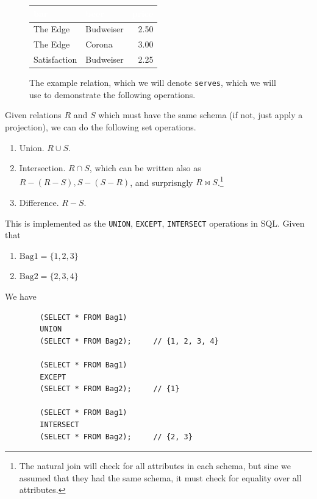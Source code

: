 \documentclass{article}
\begin{document}
    \begin{figure}[H]
      \centering
      \begin{tabular}{|l|l|r|}
      \hline
      \rowcolor[HTML]{E26B0A} 
      \textcolor{white}{\textbf{bar}} & \textcolor{white}{\textbf{beer}} & \textcolor{white}{\textbf{price}} \\ \hline
      \rowcolor[HTML]{FBCEB1}
      The Edge & Budweiser & 2.50 \\ \hline
      \rowcolor[HTML]{FBCEB1}
      The Edge & Corona & 3.00 \\ \hline
      \rowcolor[HTML]{FBCEB1}
      Satisfaction & Budweiser & 2.25 \\ \hline
      \end{tabular}
      \caption{The example relation, which we will denote \texttt{serves}, which we will use to demonstrate the following operations.} 
      \label{fig:serves}
    \end{figure}
    
    \begin{definition}
      Given relations $R$ and $S$ which must have the same schema (if not, just apply a projection), we can do the following set operations. 
      \begin{enumerate}
        \item Union. $R \cup S$. 
        \item Intersection. $R \cap S$, which can be written also as $R - (R - S), S - (S - R)$, and surprisngly $R \bowtie S$.\footnote{The natural join will check for all attributes in each schema, but sine we assumed that they had the same schema, it must check for equality over all attributes.}
        \item Difference. $R - S$. 
      \end{enumerate}
      This is implemented as the \texttt{UNION}, \texttt{EXCEPT}, \texttt{INTERSECT} operations in SQL. Given that 
      \begin{enumerate}
        \item $\mathrm{Bag1} = \{1, 2, 3\}$
        \item $\mathrm{Bag2} = \{2, 3, 4\}$
      \end{enumerate}
      We have 
      \begin{lstlisting}
        (SELECT * FROM Bag1) 
        UNION 
        (SELECT * FROM Bag2);     // {1, 2, 3, 4}

        (SELECT * FROM Bag1) 
        EXCEPT 
        (SELECT * FROM Bag2);     // {1} 

        (SELECT * FROM Bag1) 
        INTERSECT 
        (SELECT * FROM Bag2);     // {2, 3}
      \end{lstlisting}
    \end{definition}
\end{document}
